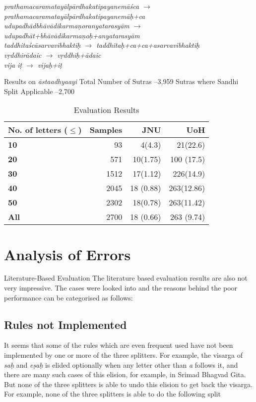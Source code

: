 \documentclass[11pt]{article}
\begin{document}
\textit{prathamacaramatay\={a}lp\={a}rdhakatipayanem\={a}\'{s}ca $\rightarrow$ prathamacaramatay\={a}lp\={a}rdhakatipayanem\={a}\d{h}+ca \\
udupadh\={a}dbh\={a}v\={a}dikarma\d{n}oranyatarasy\={a}m $\rightarrow$ udupadh\={a}t+bh\={a}v\={a}dikarma\d{n}o\d{h}+anyatarasy\={a}m \\
taddhita\'{s}c\={a}sarvavibhakti\d{h} $\rightarrow$ taddhita\d{h}+ca+ca+asarvavibhakti\d{h} \\
v\d{r}ddhir\={a}daic $\rightarrow$ v\d{r}ddhi\d{h}+\={a}daic \\
vija i\d{t} $\rightarrow$ vija\d{h}+i\d{t} \\                                                 
}

Results on \textit{\={a}staadhyaayi}
Total Number of Sutras –3,959
Sutras where Sandhi Split Applicable –2,700
    


\begin{table}[h]
\begin{center}
\begin{tabular}{ p{2cm}  r r r }
\hline  
\bf No. of letters ($\le$) & Samples & JNU & UoH \\
\hline
\bf 10 & 93 & 4(4.3) & 21(22.6) \\
\bf 20 & 571 & 10(1.75) & 100 (17.5) \\
\bf 30 & 1512 & 17(1.12) & 226(14.9) \\
\bf 40 & 2045 & 18 (0.88) & 263(12.86) \\
\bf 50 & 2302 & 18(0.78) & 263(11.42) \\
\bf All  & 2700 & 18 (0.66) & 263 (9.74) \\
\hline
\end{tabular}
\end{center}
\caption{\label{font-table} Evaluation Results }
\end{table}

\section{Analysis of Errors}
 Literature-Based Evaluation
The literature based evaluation results are also not very impressive. The cases were looked into and the reasons behind the poor performance can be categorised as follows:


\subsection{Rules not Implemented}
      It seems that some of the rules which are even frequent used have not been implemented by one or more of the three splitters. For example, the visarga of \textit{sa\d{h}} and \textit{e\d{s}a\d{h}} is elided optionally when any letter other than \textit{a} follows it, and there are many such cases of this elision, for example, in Srimad Bhagvad Gita. But none of the three splitters is able to undo this elision to get back the visarga. For example, none of the three splitters is able to do the following split
      
\end{document}
